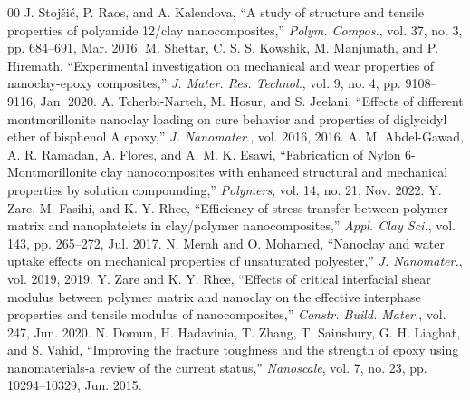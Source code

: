 \documentclass[conference]{IEEEtran}
\begin{document}
\begin{thebibliography}{00}
 J. Stoj\v{s}i\'{c}, P. Raos, and A. Kalendova, ``A study of structure and tensile properties of polyamide 12/clay nanocomposites,'' \textit{Polym. Compos.}, vol. 37, no. 3, pp. 684--691, Mar. 2016.
 M. Shettar, C. S. S. Kowshik, M. Manjunath, and P. Hiremath, ``Experimental investigation on mechanical and wear properties of nanoclay-epoxy composites,'' \textit{J. Mater. Res. Technol.}, vol. 9, no. 4, pp. 9108--9116, Jan. 2020.
 A. Tcherbi-Narteh, M. Hosur, and S. Jeelani, ``Effects of different montmorillonite nanoclay loading on cure behavior and properties of diglycidyl ether of bisphenol A epoxy,'' \textit{J. Nanomater.}, vol. 2016, 2016.
 A. M. Abdel-Gawad, A. R. Ramadan, A. Flores, and A. M. K. Esawi, ``Fabrication of Nylon 6-Montmorillonite clay nanocomposites with enhanced structural and mechanical properties by solution compounding,'' \textit{Polymers}, vol. 14, no. 21, Nov. 2022.
 Y. Zare, M. Fasihi, and K. Y. Rhee, ``Efficiency of stress transfer between polymer matrix and nanoplatelets in clay/polymer nanocomposites,'' \textit{Appl. Clay Sci.}, vol. 143, pp. 265--272, Jul. 2017.
 N. Merah and O. Mohamed, ``Nanoclay and water uptake effects on mechanical properties of unsaturated polyester,'' \textit{J. Nanomater.}, vol. 2019, 2019.
 Y. Zare and K. Y. Rhee, ``Effects of critical interfacial shear modulus between polymer matrix and nanoclay on the effective interphase properties and tensile modulus of nanocomposites,'' \textit{Constr. Build. Mater.}, vol. 247, Jun. 2020.
 N. Domun, H. Hadavinia, T. Zhang, T. Sainsbury, G. H. Liaghat, and S. Vahid, ``Improving the fracture toughness and the strength of epoxy using nanomaterials-a review of the current status,'' \textit{Nanoscale}, vol. 7, no. 23, pp. 10294--10329, Jun. 2015.
\end{thebibliography}
\end{document}
